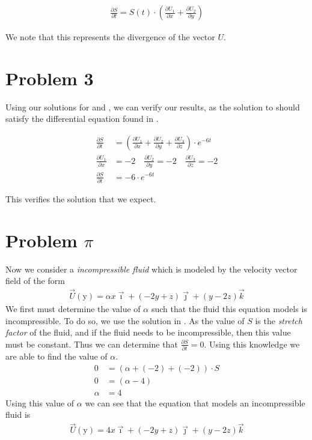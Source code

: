 \documentclass[10pt]{article}
\newcommand{\der}[2]{\frac{\partial{} #1}{\partial{} #2}}
\begin{document}
\begin{multicols}{2}
  \begin{align*}
    \der{S}{t} = S(t)\cdot\left(\der{U_1}{x}+\der{U_2}{y}\right)
  \end{align*}

  We note that this represents the divergence of the vector $U$.

  \section{Problem 3}\label{sec:problem_3_}

  Using our solutions for  and
  , we can verify our results, as the solution to
   should satisfy the differential equation found in
  .

  \begin{align*}
    \der{S}{t} &= \left(\der{U_1}{x} + \der{U_2}{y} + \der{U_3}{z}\right)\cdot
    e^{-6t}\\
    \der{U_1}{x} &= -2 \quad \der{U_2}{y} = -2\quad \der{U_3}{z} = -2\\
    \der{S}{t} &= -6\cdot e^{-6t}
  \end{align*}

  This verifies the solution that we expect.

  \section{Problem $\pi$}\label{sec:problem_pi_}

  Now we consider a \textit{incompressible fluid} which is modeled by the
  velocity vector field of the form
  \begin{align*}
    \vec{U}(\mathrm{y}) = \alpha x \vec{\imath} +
    (-2y+z)\vec{\jmath}+(y-2z)\vec{k}
  \end{align*}
  We first must determine the value of $\alpha$ such that the fluid this
  equation models is incompressible. To do so, we use the solution in
  . As the value of $S$ is the \textit{stretch factor}
  of the fluid, and if the fluid needs to be incompressible, then this value
  must be constant. Thus we can determine that $\der{S}{t} = 0$. Using this
  knowledge we are able to find the value of $\alpha$.
  \begin{align*}
    0 &= (\alpha + (-2) + (-2))\cdot S\\
    0 &= (\alpha - 4)\\
    \alpha &= 4
  \end{align*}
  Using this value of $\alpha$ we can see that the equation that models an
  incompressible fluid is
  \begin{align*}
    \vec{U}(\mathrm{y}) = 4x\vec{\imath} +
    (-2y+z)\vec{\jmath}+(y-2z)\vec{k}
  \end{align*}


\end{multicols}
\end{document}

